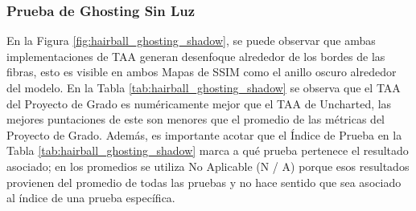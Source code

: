 \documentclass[pregrado]{tesis-usb} %
\begin{document}
\FloatBarrier

\subsubsection{Prueba de Ghosting Sin Luz}
En la Figura \ref{fig:hairball_ghosting_shadow}, se puede observar que ambas implementaciones de TAA generan desenfoque alrededor de los bordes de las fibras, esto es visible en ambos Mapas de SSIM como el anillo oscuro alrededor del modelo. En la Tabla \ref{tab:hairball_ghosting_shadow} se observa que el TAA del Proyecto de Grado es numéricamente mejor que el TAA de Uncharted, las mejores puntaciones de este son menores que el promedio de las métricas del Proyecto de Grado. Además, es importante acotar que el Índice de Prueba en la Tabla \ref{tab:hairball_ghosting_shadow} marca a qué prueba pertenece el resultado asociado; en los promedios se utiliza No Aplicable (N / A) porque esos resultados provienen del promedio de todas las pruebas y no hace sentido que sea asociado al índice de una prueba específica. 
\end{document}

